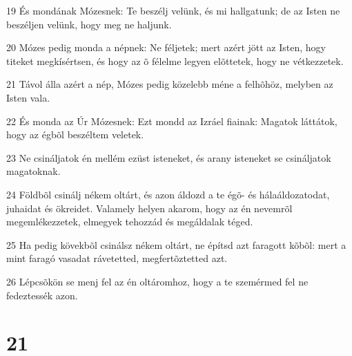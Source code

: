 \par 19 És mondának Mózesnek: Te beszélj velünk, és mi hallgatunk; de az Isten ne beszéljen velünk, hogy meg ne haljunk.
\par 20 Mózes pedig monda a népnek: Ne féljetek; mert azért jött az Isten, hogy titeket megkísértsen, és hogy az õ félelme legyen elõttetek, hogy ne vétkezzetek.
\par 21 Távol álla azért a nép, Mózes pedig közelebb méne a felhõhöz, melyben az Isten vala.
\par 22 És monda az Úr Mózesnek: Ezt mondd az Izráel fiainak: Magatok láttátok, hogy az égbõl beszéltem veletek.
\par 23 Ne csináljatok én mellém ezüst isteneket, és arany isteneket se csináljatok magatoknak.
\par 24 Földbõl csinálj nékem oltárt, és azon áldozd a te égõ- és hálaáldozatodat, juhaidat és ökreidet. Valamely helyen akarom, hogy az én nevemrõl megemlékezzetek, elmegyek tehozzád és megáldalak téged.
\par 25 Ha pedig kövekbõl csinálsz nékem oltárt, ne építsd azt faragott kõbõl: mert a mint faragó vasadat rávetetted, megfertõztetted azt.
\par 26 Lépcsõkön se menj fel az én oltáromhoz, hogy a te szemérmed fel ne fedeztessék azon.

\chapter{21}

